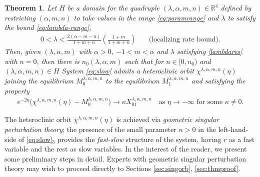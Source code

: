 \documentclass[usletter,11pt]{article}
\def\blue{\color{blue}}
\newtheorem{theorem}{Theorem}
\theoremstyle{remark}
\begin{document}
\begin{theorem} \label{thm1}
Let $H$ be a domain for the quadruple $(\lambda,\alpha,m,n)\in\mathbb{R}^4$ defined by restricting $(\alpha,m,n)$ to take values in the range
\eqref{eq:paramrange} and $\lambda$ to satisfy the bound \eqref{eq:lambda-range},
 \begin{align}
 \label{lambdares}
  0< \lambda < \frac{2(\alpha-m-n)}{1+m+n}\left(\frac{1+m}{1+m+n}\right) \quad&\text{(localizing rate bound)}. %
\end{align}
Then, given $(\lambda,\alpha,m)$ with $\alpha > 0$, $-1 < m < \alpha$ and $\lambda$ satisfying \eqref{lambdares} with $n=0$, then there is
$n_0( \lambda,\alpha,m)$ such that for $n \in [0, n_0)$ and $(\lambda,\alpha,m,n) \in H$ System \eqref{eq:slow}  admits a heteroclinic orbit $\chi^{\lambda,\alpha,m,n}(\eta)$ joining the equilibrium $M_0^{\lambda,\alpha,m,n}$ to the equilibrium $M_1^{\lambda,\alpha,m,n}$ and satisfying the property
    \begin{align}
     \label{eq:rapid}
        e^{-2\eta}\big(\chi^{\lambda,\alpha,m,n}(\eta) - M_0^{\lambda,\alpha,m,n}\big) \rightarrow \kappa X_{01}^{\lambda,\alpha,m,n} \quad \text{as $\eta \rightarrow -\infty$ for some $\kappa\ne0$}.
    \end{align}
\end{theorem}

The heteroclinic orbit $\chi^{\lambda,\alpha,m,n}(\eta)$ is achieved via {\it geometric singular perturbation theory}; the presence of the small parameter $n>0$ in the left-hand-side of \eqref{eq:slow}$_3$ {\blue provides} the {\it fast-slow} structure of the system, having $r$ as a fast variable and the rest as slow variables.  
In the interest of the reader, we present some preliminary steps in detail. Experts with geometric singular
perturbation theory may wish to proceed directly to Sections \ref{sec:singorb}, \ref{sec:thmproof}. 
\end{document}
